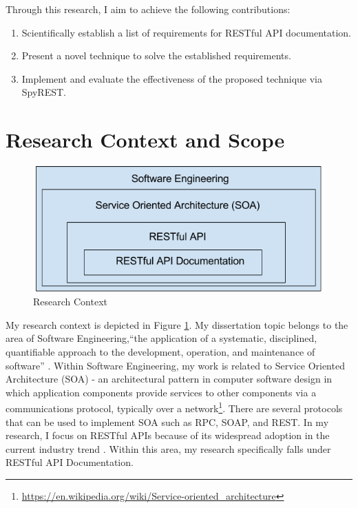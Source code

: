 \documentclass[11pt,oneside]{book}
\begin{document}
Through this research, I aim to achieve the following contributions:
\begin{enumerate}
  \item Scientifically establish a list of requirements for RESTful API documentation.
  \item Present a novel technique to solve the established requirements.
  \item Implement and evaluate the effectiveness of the proposed technique via SpyREST.
\end{enumerate}

\section{Research Context and Scope}

\begin{figure}[bth]
  \includegraphics[width=\linewidth]{context.png}
  \caption{Research Context}
  \label{fig:context}
\end{figure}

My research context is depicted in Figure \ref{fig:context}. My dissertation topic belongs to the area of Software Engineering,``the application of a systematic, disciplined, quantifiable approach to the development, operation, and maintenance of software'' \cite{iee_std}. Within Software Engineering, my work is related to Service Oriented Architecture (SOA) -  an architectural pattern in computer software design in which application components provide services to other components via a communications protocol, typically over a network\footnote{\url{https://en.wikipedia.org/wiki/Service-oriented_architecture}}. There are several protocols that can be used to implement SOA such as RPC, SOAP, and REST. In my research, I focus on RESTful APIs because of its widespread adoption in the current industry trend \cite{mangler2010origin}. Within this area, my research specifically falls under RESTful API Documentation.
\end{document}
